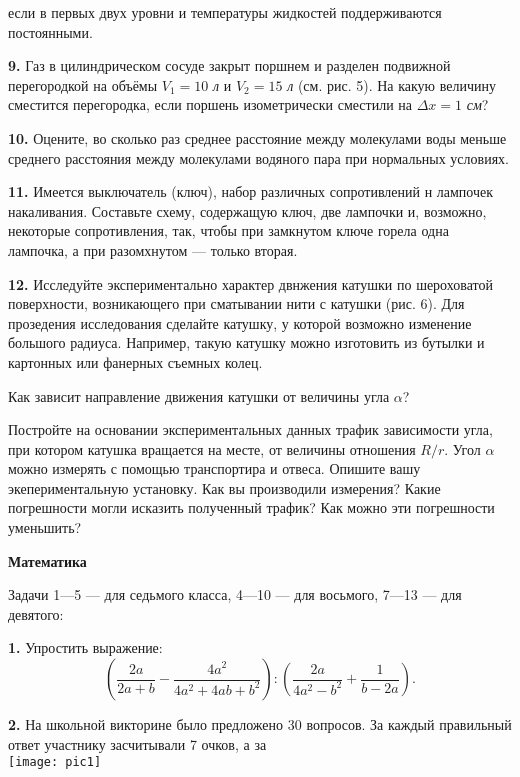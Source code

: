 \documentclass[a4paper,5pt]{article}
\begin{document}
\begin{multicols}{2}
\fontsize{11pt}{10pt}\selectfont
\setlength{\parindent}{1cm}
\noindent если в первых двух уровни и температуры жидкостей поддерживаются постоянными.
\par \textbf{9.} Газ в цилиндрическом сосуде закрыт поршнем и разделен подвижной перегородкой на объёмы $V_1=10$ \textit{л} и $V_2=15$ \textit{л} (см. рис. 5). На какую величину сместится перегородка, если поршень изометрически сместили на $\Delta x=1$ \textit{см}?
\par \textbf{10.} Оцените, во сколько раз среднее расстояние между молекулами воды меньше среднего расстояния между молекулами водяного пара при нормальных условиях.
\par \textbf{11.}  Имеется выключатель (ключ), набор различных сопротивлений н лампочек накаливания. Составьте схему, содержащую ключ, две лампочки и, возможно, некоторые сопротивления, так, чтобы при замкнутом ключе горела одна лампочка, а при разомхнутом — только вторая.
\par \textbf{12.} Исследуйте экспериментально характер двнжения катушки по шероховатой поверхности, возникающего при сматывании нити с катушки (рис. 6). Для прозедения исследования сделайте катушку, у которой возможно изменение большого радиуса. Например, такую катушку можно изготовить из бутылки и картонных или фанерных съемных колец. \par Как зависит направление движения катушки от величины угла $\alpha$?
\par
Постройте на основании экспериментальных данных трафик зависимости угла, при котором катушка вращается на месте, от величины отношения $R/r$. Угол $\alpha$ можно измерять с помощью транспортира и отвеса. Опишите вашу экепериментальную установку. Как вы производили измерения? Какие погрешности могли исказить полученный трафик? Как можно эти погрешности уменьшить?
\par\noindent\textbf{Математика}
\par Задачи 1—5 — для седьмого класса, 4—10 — для восьмого, 7—13 — для девятого:
\par \textbf{1. } Упростить выражение:
$$
\left(\frac{2a}{2a+b}-\frac{4a^2}{4a^2+4ab+b^2}\right):
\left(\frac{2a}{4a^2-b^2}+\frac{1}{b-2a}\right).
$$
\par \textbf{2. } На школьной викторине было предложено 30 вопросов. За каждый правильный ответ участнику засчитывали 7 очков, а за \\
\noindent\texttt{[image: pic1]} \\

\end{multicols}
\end{document}
